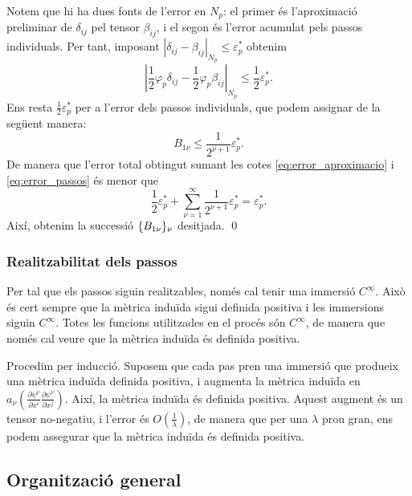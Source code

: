 {Notem que hi ha dues fonts de l'error en $N_p$: el primer és l'aproximació preliminar de $\delta_{ij}$ pel tensor $\beta_{ij}$, i el segon és l'error acumulat pels passos individuals. Per tant, imposant $|\delta_{ij}-\beta_{ij}|_{N_p} \le \varepsilon_p^*$ obtenim 
\begin{equation}\label{eq:error_aproximacio}
    \left|\frac12\varphi_p\delta_{ij}-\frac12\varphi_p\beta_{ij}\right|_{N_p} \le \frac12\varepsilon_p^*.
\end{equation}
Ens resta $\frac12\varepsilon_p^*$
per a l'error dels passos individuals, que podem assignar de la següent manera:
\begin{equation}\label{eq:error_passos}
    B_{1\nu} \le \frac{1}{2^{\nu+1}}\varepsilon_p^*.
\end{equation}
De manera que l'error total obtingut sumant les cotes \eqref{eq:error_aproximacio} i \eqref{eq:error_passos} és menor que
\begin{equation*}
    \frac12\varepsilon_p^* + \sum_{\nu=1}^\infty \frac1{2^{\nu+1}}\varepsilon_p^* = \varepsilon_p^*.
\end{equation*}
Així, obtenim la successió $\{B_{1\nu}\}_{\nu}$ desitjada.
\qed
}
\subsubsection{Realitzabilitat dels passos}
Per tal que els passos siguin realitzables, només cal tenir una immersió $C^\infty$. Això és cert sempre que la mètrica induïda sigui definida positiva i les immersions siguin $C^\infty$. Totes les funcions utilitzades en el procés són $C^\infty$, de manera que només cal veure que la mètrica induïda és definida positiva.

Procedim per inducció. Suposem que cada pas pren una immersió que produeix una mètrica induïda definida positiva, i augmenta la mètrica induïda en $a_\nu\left(\frac{\partial\psi^\nu}{\partial x^i}\frac{\partial\psi^\nu}{\partial x^j}\right)$. Així, la mètrica induïda és definida positiva. Aquest augment és un tensor no-negatiu, i l'error és $O\left(\frac1{\lambda}\right)$, de manera que per una $\lambda$ prou gran, ens podem assegurar que la mètrica induïda és definida positiva.

\subsection{Organització general}

